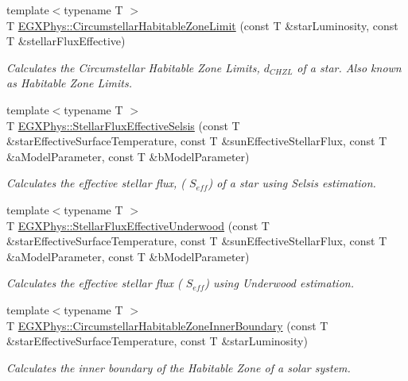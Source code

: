 \begin{DoxyCompactItemize}
\item 
{\footnotesize template$<$typename T $>$ }\\T \hyperlink{group___astrophysics_ga23a8f602461ea3257e8767b1d455c383}{E\+G\+X\+Phys\+::\+Circumstellar\+Habitable\+Zone\+Limit} (const T \&star\+Luminosity, const T \&stellar\+Flux\+Effective)
\begin{DoxyCompactList}\small\item\em Calculates the Circumstellar Habitable Zone Limits, $d_{CHZL}$ of a star. Also known as Habitable Zone Limits. \end{DoxyCompactList}\item 
{\footnotesize template$<$typename T $>$ }\\T \hyperlink{group___astrophysics_ga3ce3a04fec7b1c8fb66ac54270ce3902}{E\+G\+X\+Phys\+::\+Stellar\+Flux\+Effective\+Selsis} (const T \&star\+Effective\+Surface\+Temperature, const T \&sun\+Effective\+Stellar\+Flux, const T \&a\+Model\+Parameter, const T \&b\+Model\+Parameter)
\begin{DoxyCompactList}\small\item\em Calculates the effective stellar flux, ( $S_{eff}$) of a star using Selsis estimation. \end{DoxyCompactList}\item 
{\footnotesize template$<$typename T $>$ }\\T \hyperlink{group___astrophysics_ga34d1e39bce17904bc6d383f1935c79d6}{E\+G\+X\+Phys\+::\+Stellar\+Flux\+Effective\+Underwood} (const T \&star\+Effective\+Surface\+Temperature, const T \&sun\+Effective\+Stellar\+Flux, const T \&a\+Model\+Parameter, const T \&b\+Model\+Parameter)
\begin{DoxyCompactList}\small\item\em Calculates the effective stellar flux ( $S_{eff}$) using Underwood estimation. \end{DoxyCompactList}\item 
{\footnotesize template$<$typename T $>$ }\\T \hyperlink{group___astrophysics_ga9ee2e8023cb444aa4638c962788b5853}{E\+G\+X\+Phys\+::\+Circumstellar\+Habitable\+Zone\+Inner\+Boundary} (const T \&star\+Effective\+Surface\+Temperature, const T \&star\+Luminosity)
\begin{DoxyCompactList}\small\item\em Calculates the inner boundary of the Habitable Zone of a solar system. \end{DoxyCompactList}\item 

\end{DoxyCompactItemize}
